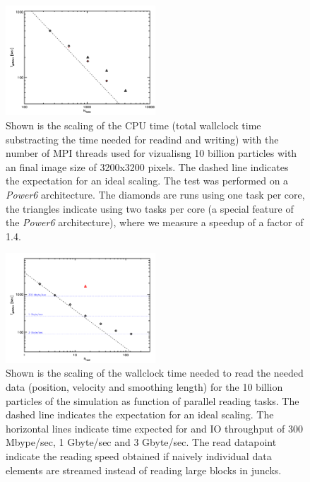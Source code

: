 \begin{figure}
\begin{center}
\includegraphics[width=0.5\textwidth]{t_cpu.pdf}
\end{center}
\caption{Shown is the scaling of the CPU time (total wallclock time substracting the time needed for 
readind and writing) with the number of MPI threads used for vizualisng 10 billion particles with an final
image size of 3200x3200 pixels. The dashed line indicates the expectation for an ideal scaling. The test was 
performed on a {\it Power6} architecture. The diamonds are runs using one task per core, the triangles indicate
using two tasks per core (a special feature of the {\it Power6} architecture), where we measure a speedup of 
a factor of 1.4.}\label{cpu_scaling}
\end{figure}

\begin{figure}
\begin{center}
\includegraphics[width=0.5\textwidth]{t_read.pdf}
\end{center}
\caption{Shown is the scaling of the wallclock time needed to read the needed data 
(position, velocity and smoothing length) for the 10 billion particles of the simulation
as function of parallel reading tasks. The dashed line indicates the expectation for an 
ideal scaling. The horizontal lines indicate time expected for and IO throughput of 300 Mbype/sec,
1 Gbyte/sec and 3 Gbyte/sec. The read datapoint indicate the reading speed obtained if naively 
individual data elements are streamed instead of reading large blocks in juncks.}\label{read_scaling}
\end{figure}


